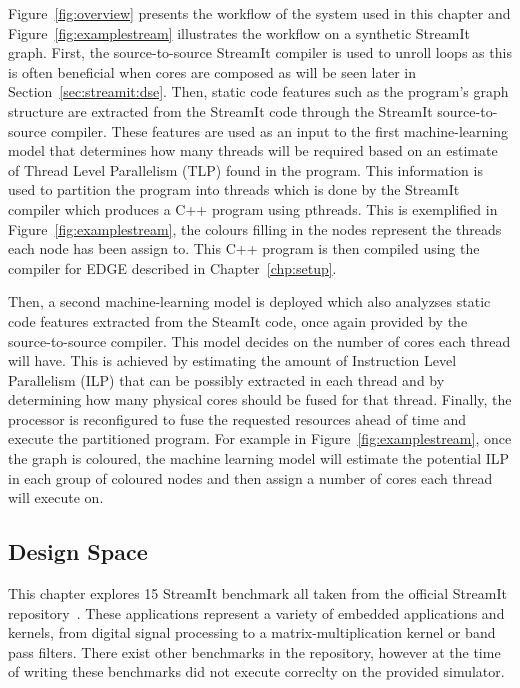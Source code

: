 Figure~\ref{fig:overview} presents the workflow of the system used in this chapter and Figure~\ref{fig:examplestream} illustrates the workflow on a synthetic StreamIt graph.
First, the source-to-source StreamIt compiler is used to unroll loops as this is often beneficial when cores are composed as will be seen later in Section~\ref{sec:streamit:dse}.
Then, static code features such as the program's graph structure are extracted from the StreamIt code through the StreamIt source-to-source compiler.
These features are used as an input to the first machine-learning model that determines how many threads will be required based on an estimate of Thread Level Parallelism (TLP) found in the program.
This information is used to partition the program into threads which is done by the StreamIt compiler which produces a C++ program using pthreads.
This is exemplified in Figure~\ref{fig:examplestream}, the colours filling in the nodes represent the threads each node has been assign to.
This C++ program is then compiled using the compiler for EDGE described in Chapter~\ref{chp:setup}.

Then, a second machine-learning model is deployed which also analyzses static code features extracted from the SteamIt code, once again provided by the source-to-source compiler.
This model decides on the number of cores each thread will have.
This is achieved by estimating the amount of Instruction Level Parallelism (ILP) that can be possibly extracted in each thread and by determining how many physical cores should be fused for that thread.
Finally, the processor is reconfigured to fuse the requested resources ahead of time and execute the partitioned program.
For example in Figure~\ref{fig:examplestream}, once the graph is coloured, the machine learning model will estimate the potential ILP in each group of coloured nodes and then assign a number of cores each thread will execute on.

\subsection{Design Space}

This chapter explores 15 StreamIt benchmark all taken from the official StreamIt repository~\cite{streamitrepo}.
These applications represent a variety of embedded applications and kernels, from digital signal processing to a matrix-multiplication kernel or band pass filters.
There exist other benchmarks in the repository, however at the time of writing these benchmarks did not execute correclty on the provided simulator.

